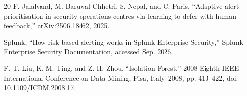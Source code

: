 \documentclass[conference]{IEEEtran}
\begin{document}
\begin{thebibliography}{20}
 F. Jalalvand, M. Baruwal Chhetri, S. Nepal, and C. Paris, ``Adaptive alert prioritisation in security operations centres via learning to defer with human feedback,'' arXiv:2506.18462, 2025.

 Splunk, ``How risk-based alerting works in Splunk Enterprise Security,'' Splunk Enterprise Security Documentation, accessed Sep. 2026.

 F. T. Liu, K. M. Ting, and Z.-H. Zhou, ``Isolation Forest,'' 2008 Eighth IEEE International Conference on Data Mining, Pisa, Italy, 2008, pp. 413--422, doi: 10.1109/ICDM.2008.17.

\end{thebibliography}
\end{document}

